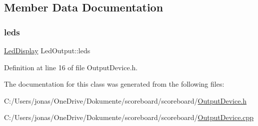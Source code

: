 \subsection{Member Data Documentation}
\mbox{\label{class_led_output_a79e4a1c6bf8b16fbabf7ef17a870d83d}} 
\subsubsection{\texorpdfstring{leds}{leds}}
{\footnotesize\ttfamily \hyperlink{class_led_display}{Led\+Display} Led\+Output\+::leds}



Definition at line 16 of file Output\+Device.\+h.



The documentation for this class was generated from the following files\+:\begin{DoxyCompactItemize}
\item 
C\+:/\+Users/jonas/\+One\+Drive/\+Dokumente/scoreboard/scoreboard/\hyperlink{_output_device_8h}{Output\+Device.\+h}\item 
C\+:/\+Users/jonas/\+One\+Drive/\+Dokumente/scoreboard/scoreboard/\hyperlink{_output_device_8cpp}{Output\+Device.\+cpp}\end{DoxyCompactItemize}
